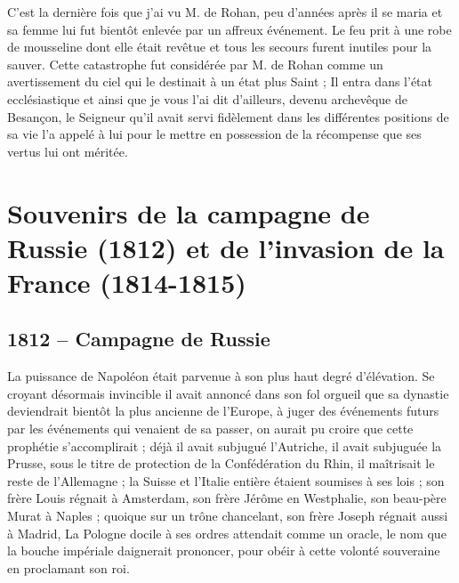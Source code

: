 \documentclass[11pt,a4paper]{report}
\begin{document}
C'est la dernière fois que j'ai vu M. de Rohan, peu d'années après il se maria et sa femme lui fut bientôt enlevée par un affreux événement. Le feu prit à une robe de mousseline dont elle était revêtue et tous les secours furent inutiles pour la sauver. Cette catastrophe fut considérée par M. de Rohan comme un avertissement du ciel qui le destinait à un état plus Saint ; Il entra dans l'état ecclésiastique et ainsi que je vous l'ai dit d'ailleurs, devenu archevêque de Besançon, le Seigneur qu'il avait servi fidèlement dans les différentes positions de sa vie l'a appelé à lui pour le mettre en possession de la récompense que ses vertus lui ont méritée.

\chapter{Souvenirs de la campagne de Russie (1812) et de l'invasion de la France (1814-1815)}

\section*{1812 -- Campagne de Russie}

La puissance de Napoléon était parvenue à son plus haut degré d'élévation. Se croyant désormais invincible il avait annoncé dans son fol orgueil que sa dynastie deviendrait bientôt la plus ancienne de l'Europe, à juger des événements futurs par les événements qui venaient de sa passer, on aurait pu croire que cette prophétie s'accomplirait ; déjà il avait subjugué l'Autriche, il avait subjuguée la Prusse, sous le titre de protection de la Confédération du Rhin, il maîtrisait le reste de l'Allemagne ; la Suisse et l'Italie entière étaient soumises à ses lois ; son frère Louis régnait à Amsterdam, son frère Jérôme en Westphalie, son beau-père Murat à Naples ; quoique sur un trône chancelant, son frère Joseph régnait aussi à Madrid, La Pologne docile à ses ordres attendait comme un oracle, le nom que la bouche impériale daignerait prononcer, pour obéir à cette volonté souveraine en proclamant son roi.
\end{document}
